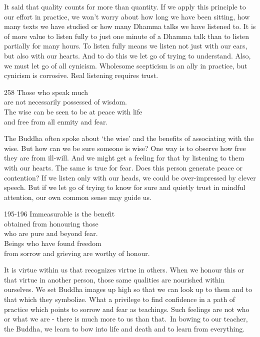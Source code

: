 \begin{dhpRefl}
It said that quality counts for more than quantity. If we apply this principle to our effort in practice, we won't worry about how long we have been sitting, how many texts we have studied or how many Dhamma talks we have listened to. It is of more value to listen fully to just one minute of a Dhamma talk than to listen partially for many hours. To listen fully means we listen not just with our ears, but also with our hearts. And to do this we let go of trying to understand. Also, we must let go of all cynicism. Wholesome scepticism is an ally in practice, but cynicism is corrosive. Real listening requires trust.
\end{dhpRefl}


\begin{dhpVerse}{258}
\label{dhp-258}
Those who speak much\\
are not necessarily possessed of wisdom.\\
The wise can be seen to be at peace with life\\
and free from all enmity and fear.
\end{dhpVerse}

\begin{dhpRefl}
The Buddha often spoke about `the wise' and the benefits of associating with the wise. But how can we be sure someone is wise? One way is to observe how free they are from ill-will. And we might get a feeling for that by listening to them with our hearts. The same is true for fear. Does this person generate peace or contention? If we listen only with our heads, we could be over-impressed by clever speech. But if we let go of trying to know for sure and quietly trust in mindful attention, our own common sense may guide us.
\end{dhpRefl}


\begin{dhpVerse}{195-196}
\label{dhp-195}\label{dhp-196}
Immeasurable is the benefit\\
obtained from honouring those\\
who are pure and beyond fear.\\
Beings who have found freedom\\
from sorrow and grieving are worthy of honour.
\end{dhpVerse}

\begin{dhpRefl}
It is virtue within us that recognizes virtue in others. When we honour this or that virtue in another person, those same qualities are nourished within ourselves. We set Buddha images up high so that we can look up to them and to that which they symbolize. What a privilege to find confidence in a path of practice which points to sorrow and fear as teachings. Such feelings are not who or what we are - there is much more to us than that. In bowing to our teacher, the Buddha, we learn to bow into life and death and to learn from everything.
\end{dhpRefl}

